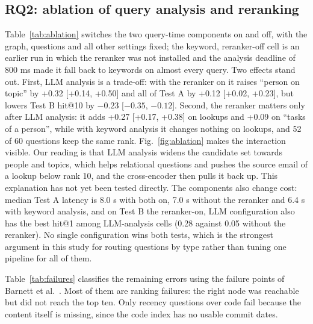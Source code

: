 \documentclass[12pt,onecolumn,draftclsnofoot]{IEEEtran}
\begin{document}
\subsection{RQ2: ablation of query analysis and reranking}
Table~\ref{tab:ablation} switches the two query-time components on and off, with the graph, questions and all other settings fixed; the keyword, reranker-off cell is an earlier run in which the reranker was not installed and the analysis deadline of 800 ms made it fall back to keywords on almost every query. Two effects stand out. First, LLM analysis is a trade-off: with the reranker on it raises ``person on topic'' by +0.32 [+0.14, +0.50] and all of Test A by +0.12 [+0.02, +0.23], but lowers Test B hit@10 by $-0.23$ [$-0.35$, $-0.12$]. Second, the reranker matters only after LLM analysis: it adds +0.27 [+0.17, +0.38] on lookups and +0.09 on ``tasks of a person'', while with keyword analysis it changes nothing on lookups, and 52 of 60 questions keep the same rank. Fig.~\ref{fig:ablation} makes the interaction visible. Our reading is that LLM analysis widens the candidate set towards people and topics, which helps relational questions and pushes the source email of a lookup below rank 10, and the cross-encoder then pulls it back up. This explanation has not yet been tested directly. The components also change cost: median Test A latency is 8.0 s with both on, 7.0 s without the reranker and 6.4 s with keyword analysis, and on Test B the reranker-on, LLM configuration also has the best hit@1 among LLM-analysis cells (0.28 against 0.05 without the reranker). No single configuration wins both tests, which is the strongest argument in this study for routing questions by type rather than tuning one pipeline for all of them.

Table~\ref{tab:failures} classifies the remaining errors using the failure points of Barnett et al.\ \cite{barnett2024failure}. Most of them are ranking failures: the right node was reachable but did not reach the top ten. Only recency questions over code fail because the content itself is missing, since the code index has no usable commit dates.
\end{document}
